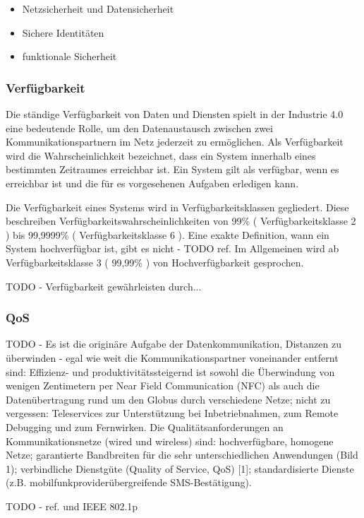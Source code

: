 \begin{itemize}
    \item Netzsicherheit und Datensicherheit
    \item Sichere Identitäten
    \item funktionale Sicherheit
\end{itemize}

\subsubsection{Verfügbarkeit}
Die ständige Verfügbarkeit von Daten und Diensten spielt in der Industrie 4.0 eine bedeutende Rolle, um den Datenaustausch zwischen zwei Kommunikationspartnern im Netz jederzeit zu ermöglichen. Als Verfügbarkeit wird die Wahrscheinlichkeit bezeichnet, dass ein System innerhalb eines bestimmten Zeitraumes erreichbar ist. Ein System gilt als verfügbar, wenn es erreichbar ist und die für es vorgesehenen Aufgaben erledigen kann.

Die Verfügbarkeit eines Systems wird in Verfügbarkeitsklassen gegliedert. Diese beschreiben Verfügbarkeitswahrscheinlichkeiten von 99\% ( Verfügbarkeitsklasse 2 ) bis 99,9999\% ( Verfügbarkeitsklasse 6 ). Eine exakte Definition, wann ein System hochverfügbar ist, gibt es nicht - TODO ref. Im Allgemeinen wird ab Verfügbarkeitsklasse 3 ( 99,99\% ) von Hochverfügbarkeit gesprochen.

TODO - Verfügbarkeit gewährleisten durch...

\subsubsection{\ac{QoS}}
TODO - Es ist die originäre Aufgabe der Datenkommunikation, Distanzen zu überwinden - egal wie weit die Kommunikationspartner voneinander entfernt sind: Effizienz- und produktivitätssteigernd ist sowohl die Überwindung von wenigen Zentimetern per Near Field Communication (NFC) als auch die Datenübertragung rund um den Globus durch verschiedene Netze; nicht zu vergessen: Teleservices zur Unterstützung bei Inbetriebnahmen, zum Remote Debugging und zum Fernwirken. Die Qualitätsanforderungen an Kommunikationsnetze (wired und wireless) sind: hochverfügbare, homogene Netze; garantierte Bandbreiten für die sehr unterschiedlichen Anwendungen (Bild 1); verbindliche Dienstgüte (Quality of Service, QoS) [1]; standardisierte Dienste (z.B. mobilfunkproviderübergreifende SMS-Bestätigung). 

TODO - ref. \cite{torscht2014} und IEEE 802.1p

